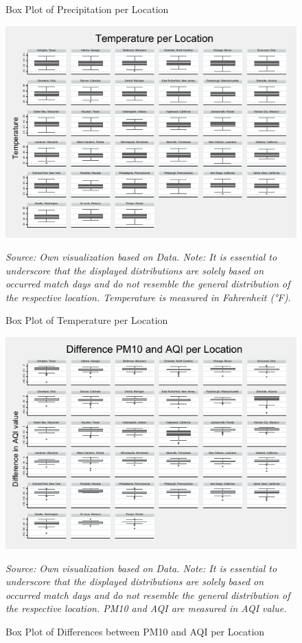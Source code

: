 \documentclass[12pt,a4paper]{article}
\begin{document}
{\begin{figure}
	\caption{Box Plot of Precipitation per Location}
	\label{AppF:2}
\end{figure}
\vfill
\clearpage
\vfill
\begin{figure}
	\center
	\includegraphics[scale=1.7]{../05_Figures/Temperature_per_Place.pdf}
	\caption*{\footnotesize \textit{Source: Own visualization based on \citeauthor{PRISM} Data. Note: It is essential to underscore that the displayed distributions are solely based on occurred match days and do not resemble the general distribution of the respective location. Temperature is measured in Fahrenheit (°F).}}
	\caption{Box Plot of Temperature per Location}
	\label{AppF:3}
\end{figure}
\vfill
\clearpage
\vfill
\begin{figure}[h]
	\center
	\includegraphics[scale=1.7]{../05_Figures/Difference_per_Place.pdf}
	\caption*{\footnotesize \textit{Source: Own visualization based on \citeauthor{EPA} Data. Note: It is essential to underscore that the displayed distributions are solely based on occurred match days and do not resemble the general distribution of the respective location. PM10 and AQI are measured in AQI value.}}
	\caption{Box Plot of Differences between PM10 and AQI per Location}
	\label{AppF:4}
\end{figure}

}
\end{document}
